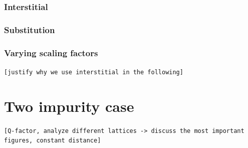 \documentclass[aps,pra,superscriptaddress,twocolumn]{revtex4-1}
\newcommand{\commentSO}[1]{\texttt{\color{orange}[#1]}}
\begin{document}
\subsubsection{Interstitial}


\subsubsection{Substitution}

\subsubsection{Varying scaling factors}
\commentSO{justify why we use interstitial in the following}

\section{Two impurity case}
\commentSO{Q-factor, analyze different lattices -> discuss the most important figures, constant distance}
\end{document}
